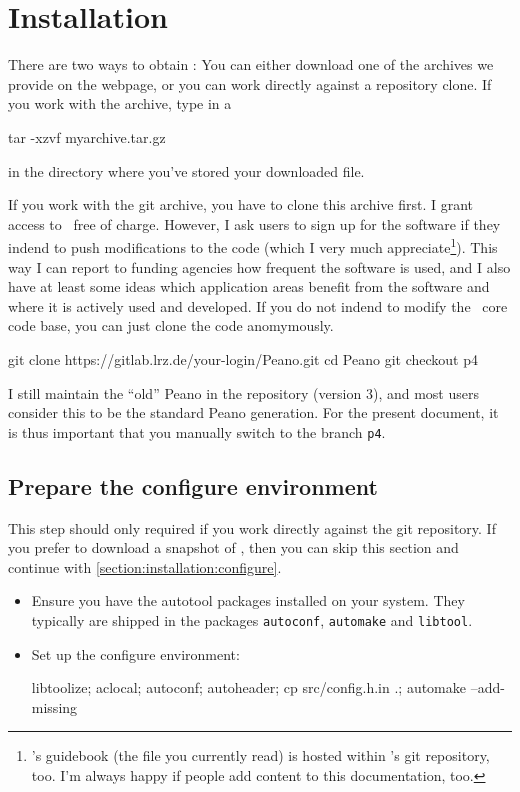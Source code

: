 \chapter{Installation}

There are two ways to obtain \Peano: 
You can either download one of the archives we provide on the webpage, or you
can work directly against a repository clone.
If you work with the archive, type in a 
\begin{code}
tar -xzvf myarchive.tar.gz
\end{code}
in the directory where you've stored your downloaded file.


If you work with the git archive, you have to clone this archive first. 
I grant access to \Peano\  free of charge.
However, I ask users to sign up for the software if they indend to push
modifications to the code (which I very much appreciate\footnote{\Peano's
guidebook (the file you currently read) is hosted within \Peano's git
repository, too. I'm always happy if people add content to this
documentation, too.}).
This way I can report to funding agencies how frequent the software is used, and
I also have at least some ideas which application areas benefit from the
software and where it is actively used and developed.
If you do not indend to modify the \Peano\ core code base, you can just clone
the code anomymously.

\begin{code}
git clone https://gitlab.lrz.de/your-login/Peano.git
cd Peano
git checkout p4
\end{code}


\begin{remark}
I still maintain the ``old'' Peano in the repository (version 3), and most users
consider this to be the standard Peano generation.
For the present document, it is thus important that you manually switch to the
branch \texttt{p4}.
\end{remark}



\section{Prepare the configure environment}

This step should only required if you work directly against the git repository.
If you prefer to download a snapshot of \Peano, then you can skip this section
and continue with \ref{section:installation:configure}.


\begin{itemize}
  \item Ensure you have the autotool packages installed on your system. They
  typically are shipped in the packages \texttt{autoconf}, \texttt{automake} and
  \texttt{libtool}.
  \item Set up the configure environment: 
 \begin{code}
 libtoolize; aclocal; autoconf; autoheader; 
 cp src/config.h.in .; 
 automake --add-missing
 \end{code}
\end{itemize}



